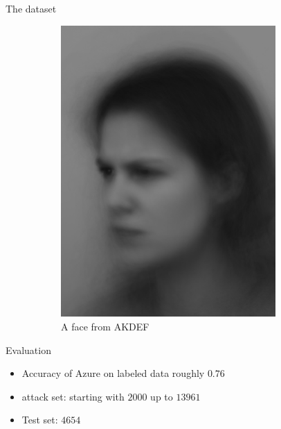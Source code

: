 \documentclass[10pt]{beamer}
\begin{document}
\begin{frame}[fragile]{The dataset}
\begin{figure}[h!]
\begin{subfigure}[c]{0.45\textwidth}
            \includegraphics[width=0.9\textwidth]{exercise_3/paper/images/FANHL.JPG}
            \caption{A face from AKDEF}
            \label{fig:AKDEF_face}
        \end{subfigure}
        \caption{}
        \label{fig:faces}
    \end{figure}
\end{frame}
\begin{frame}[fragile]{Evaluation}
\begin{itemize}
    \item Accuracy of Azure on labeled data roughly $0.76$
    \item attack set: starting with $2000$ up to $13961$
    \item Test set: $4654$
\end{itemize}
\end{frame}
\end{document}
